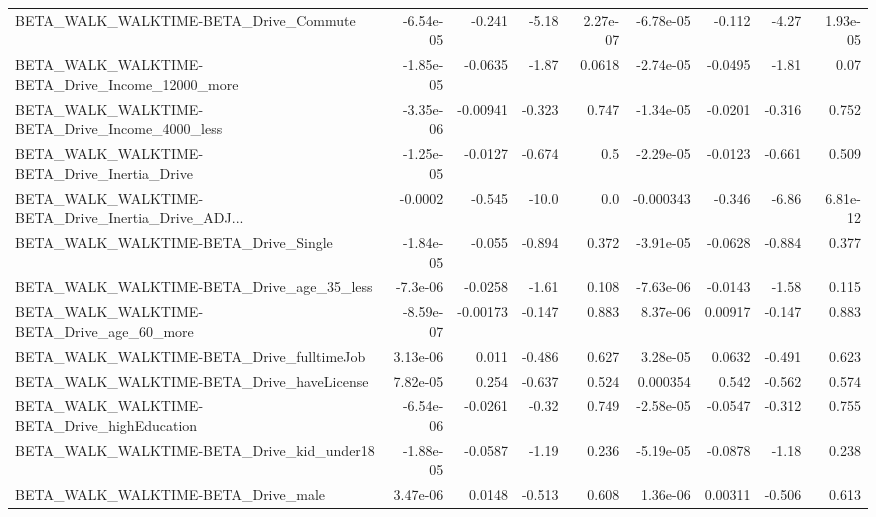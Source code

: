 \begin{tabular}{lrrrrrrrr}
BETA\_WALK\_WALKTIME-BETA\_Drive\_Commute              &   -6.54e-05 &       -0.241 &    -5.18 & 2.27e-07 &  -6.78e-05 &      -0.112 &        -4.27 &      1.93e-05 \\
BETA\_WALK\_WALKTIME-BETA\_Drive\_Income\_12000\_more    &   -1.85e-05 &      -0.0635 &    -1.87 &   0.0618 &  -2.74e-05 &     -0.0495 &        -1.81 &          0.07 \\
BETA\_WALK\_WALKTIME-BETA\_Drive\_Income\_4000\_less     &   -3.35e-06 &     -0.00941 &   -0.323 &    0.747 &  -1.34e-05 &     -0.0201 &       -0.316 &         0.752 \\
BETA\_WALK\_WALKTIME-BETA\_Drive\_Inertia\_Drive        &   -1.25e-05 &      -0.0127 &   -0.674 &      0.5 &  -2.29e-05 &     -0.0123 &       -0.661 &         0.509 \\
BETA\_WALK\_WALKTIME-BETA\_Drive\_Inertia\_Drive\_ADJ... &     -0.0002 &       -0.545 &    -10.0 &      0.0 &  -0.000343 &      -0.346 &        -6.86 &      6.81e-12 \\
BETA\_WALK\_WALKTIME-BETA\_Drive\_Single               &   -1.84e-05 &       -0.055 &   -0.894 &    0.372 &  -3.91e-05 &     -0.0628 &       -0.884 &         0.377 \\
BETA\_WALK\_WALKTIME-BETA\_Drive\_age\_35\_less          &    -7.3e-06 &      -0.0258 &    -1.61 &    0.108 &  -7.63e-06 &     -0.0143 &        -1.58 &         0.115 \\
BETA\_WALK\_WALKTIME-BETA\_Drive\_age\_60\_more          &   -8.59e-07 &     -0.00173 &   -0.147 &    0.883 &   8.37e-06 &     0.00917 &       -0.147 &         0.883 \\
BETA\_WALK\_WALKTIME-BETA\_Drive\_fulltimeJob          &    3.13e-06 &        0.011 &   -0.486 &    0.627 &   3.28e-05 &      0.0632 &       -0.491 &         0.623 \\
BETA\_WALK\_WALKTIME-BETA\_Drive\_haveLicense          &    7.82e-05 &        0.254 &   -0.637 &    0.524 &   0.000354 &       0.542 &       -0.562 &         0.574 \\
BETA\_WALK\_WALKTIME-BETA\_Drive\_highEducation        &   -6.54e-06 &      -0.0261 &    -0.32 &    0.749 &  -2.58e-05 &     -0.0547 &       -0.312 &         0.755 \\
BETA\_WALK\_WALKTIME-BETA\_Drive\_kid\_under18          &   -1.88e-05 &      -0.0587 &    -1.19 &    0.236 &  -5.19e-05 &     -0.0878 &        -1.18 &         0.238 \\
BETA\_WALK\_WALKTIME-BETA\_Drive\_male                 &    3.47e-06 &       0.0148 &   -0.513 &    0.608 &   1.36e-06 &     0.00311 &       -0.506 &         0.613 \\

\end{tabular}
